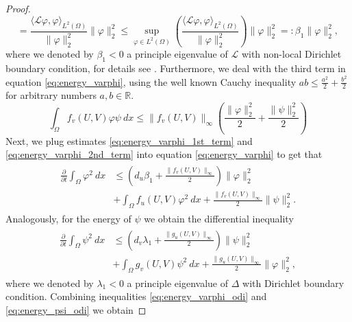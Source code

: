 \documentclass[12pt, a4paper]{article}
\theoremstyle{break}
\theoremstyle{break}
\theoremstyle{break}
\theoremstyle{break}
\theoremstyle{break}
\theoremstyle{break}
\theoremstyle{break}
\begin{document}
\begin{proof}
\begin{equation}
        =
        \frac{\langle \mathcal{L}\varphi, \varphi \rangle_{L^2(\Omega)}}{\|\varphi\|_2^2}\|\varphi\|_2^2
        \leq
        \sup_{\varphi \in L^2(\Omega)}\left( \frac{\langle \mathcal{L}\varphi, \varphi \rangle_{L^2(\Omega)}}{\|\varphi\|^2_2} \right) \|\varphi\|_2^2 =: \beta_1 \|\varphi\|_2^2,
    \end{equation}
    where we denoted by $\beta_1 < 0$ a principle eigenvalue of $\mathcal{L}$ with non-local Dirichlet boundary condition, for details see \cite{GarciaMelianRossi2009}. Furthermore, we deal with the third term in equation \eqref{eq:energy_varphi}, using the well known Cauchy inequality $ab \leq \frac{a^2}{2} + \frac{b^2}{2}$ for arbitrary numbers $a, b \in \mathbb{R}$.
    \begin{equation}
        \label{eq:energy_varphi_2nd_term}
        \int_\Omega f_v(U,V) \varphi \psi \:dx \leq \|f_v(U,V)\|_\infty \left( \frac{\|\varphi\|_2^2}{2} + \frac{\|\psi\|_2^2}{2} \right)
    \end{equation}
    Next, we plug estimates \eqref{eq:energy_varphi_1st_term} and \eqref{eq:energy_varphi_2nd_term} into equation \eqref{eq:energy_varphi} to get that
    \begin{align}
        \label{eq:energy_varphi_odi}
        \begin{split}
            \frac{\partial}{\partial t} \int_\Omega \varphi^2\:dx
            &\leq
            \left(d_u \beta_1 + \frac{\|f_v(U,V)\|_\infty}{2}\right) \|\varphi\|_2^2 \\
            &+
            \int_\Omega f_u(U,V) \varphi^2\:dx + 
            \frac{\|f_v(U,V)\|_\infty}{2}\|\psi\|_2^2.
        \end{split}
    \end{align}
    Analogously, for the energy of $\psi$ we obtain the differential inequality
    \begin{align}
        \label{eq:energy_psi_odi}
        \begin{split}
            \frac{\partial}{\partial t} \int_\Omega \psi^2\:dx
            &\leq
            \left(d_v \lambda_1 + \frac{\|g_u(U,V)\|_\infty}{2} \right) \|\psi\|_2^2 \\
            &+
            \int_\Omega g_v(U,V) \psi^2 \:dx + \frac{\|g_u(U,V)\|_\infty}{2} \|\varphi\|_2^2,
        \end{split}
    \end{align}
    where we denoted by $\lambda_1 < 0$ a principle eigenvalue of $\Delta$ with Dirichlet boundary condition. Combining inequalities \eqref{eq:energy_varphi_odi} and \eqref{eq:energy_psi_odi} we obtain

\end{proof}
\end{document}
